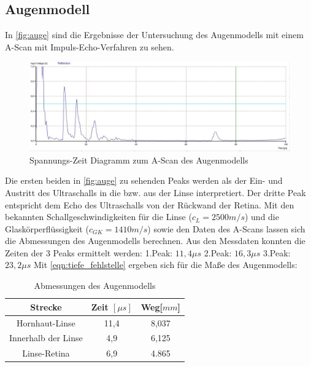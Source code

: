 \subsection{Augenmodell}
In \autoref{fig:auge} sind die Ergebnisse der Untersuchung des Augenmodells mit einem A-Scan mit Impuls-Echo-Verfahren zu sehen.
\begin{figure}[H]
  \centering
  \includegraphics[width=\textwidth]{messungen/auge/auge.jpg}
  \caption{Spannungs-Zeit Diagramm zum A-Scan des Augenmodells}
  \label{fig:auge}
\end{figure}

Die ersten beiden in \autoref{fig:auge} zu sehenden Peaks werden als der Ein- und Austritt des Ultraschalls in die bzw. aus der Linse interpretiert. Der dritte Peak entspricht dem Echo des Ultraschalls von der Rückwand der Retina. Mit den bekannten Schallgeschwindigkeiten für die Linse ($c_{L} = 2500 m/s$) und die Glaskörperflüssigkeit ($c_{GK} = 1410 m/s$) sowie den Daten des A-Scans lassen sich die Abmessungen des Augenmodells berechnen. Aus den Messdaten konnten die Zeiten der 3 Peaks ermittelt werden:\newline
1.Peak: $11,4 \mu s$ \newline 2.Peak: $16,3 \mu s$ \newline 3.Peak: $23,2 \mu s$ \newline
Mit \autoref{eqn:tiefe_fehlstelle} ergeben sich für die Maße des Augenmodells:
\begin{table}
  \centering
  \caption{Abmessungen des Augenmodells}
\label{tab:mess2}
  \begin{tabular}{c c c}
  \toprule
  Strecke & Zeit $[\mu s]$ & Weg[$mm$]\\
  \midrule
  Hornhaut-Linse & 11,4 & 8,037 \\
  Innerhalb der Linse & 4,9 & 6,125\\
  Linse-Retina & 6,9 & 4.865\\
  \bottomrule
  \end{tabular}
  \end{table}